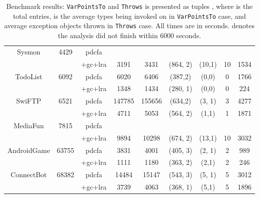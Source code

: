\begin{table}
{\begin{tabular}{| c| c | c| c | c | c | c | c | c |}
               Sysmon & \multirow{2}{*}{4429}& pdcfa &   &  &  &    &   & 
                                               \\ && +gc+lra & 3191  & 3431  &   (864, 2)& (10,1) &10& 1534 \\ \hline
               TodoList & \multirow{2}{*}{6092}& pdcfa & 6020  & 6406  &  (387,2) & (0,0)  & 0  & 1766
                \\ && +gc+lra & 1348  & 1434  &   (280, 1)& (0,0) & 0& 224 \\
                \hline
SwiFTP & \multirow{2}{*}{6521}& pdcfa & 147785  & 155656  &  (634,2) &  (3, 1)  &  3 & 4277
                                                         \\ && +gc+lra & 4711  & 5053  &   (564, 2)& (1,1) & 1 & 1871 \\
                                                         \hline
MediaFun&  \multirow{2}{*}{7815}& pdcfa &   & &  &   &   &  
                                    \\ && +gc+lra & 9894  & 10298  &   (674, 2)& (13,1) & 10 & 3032 \\
                                    \hline                                      
               AndroidGame  &\multirow{2}{*}{63755} &pdcfa & 3831  & 4001  &  (405, 3) &  (2, 1)  &  2 & 989 
                                                                    \\  && +gc+lra & 1111  & 1180  &   (363, 2)& (2,1) & 2& 246 \\
                                                                    \hline
                                                         
                     ConnectBot &\multirow{2}{*}{68382}& pdcfa & 14484  & 15147  &  (543, 3) &  (5, 1)  & 5  & 3012 
                     \\ && +gc+lra & 3739  & 4063  &   (368, 1)& (5,1) & 5& 1896 \\
                     \hline


     \hline
    \end{tabular}    
    }
    \caption{Benchmark results: {\tt{VarPointsTo}} and {\tt{Throws}} is 
    presented as tuples , where  is the total entries,  is the average 
    types being invoked on in {\tt{VarPointsTo}} case,
     and average exception objects thrown in {\tt{Throws}} case. 
     All times are in seconds.
      denotes the analysis did not finish within 6000 seconds.}
     \label{tbl:result}
\end{table} 
 

